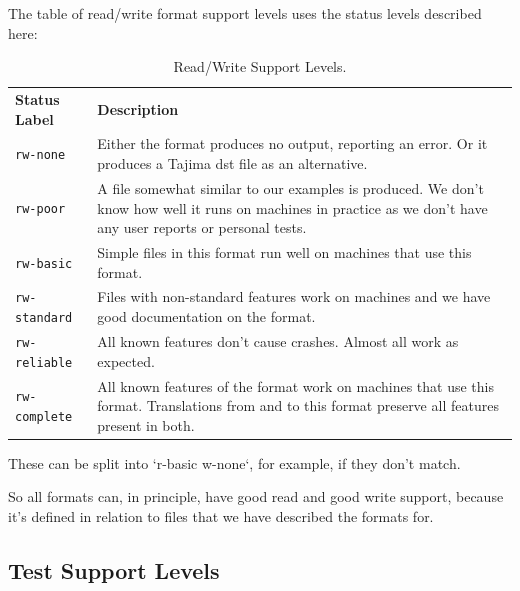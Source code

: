 \documentclass[10pt]{report}
\begin{document}
The table of read/write format support levels uses the status levels described here:

\begin{longtable}{p{4cm} p{8cm}}
\caption{Read/Write Support Levels.}
\label{tab:read-write-support} \\
\textbf{Status Label} &
\textbf{Description} \\

\texttt{rw-none} &
Either the format produces no output, reporting an error. Or it produces a
Tajima dst file as an alternative. \\

\texttt{rw-poor} &
A file somewhat similar to our examples is produced. We don't know how well
it runs on machines in practice as we don't have any user reports or personal
tests. \\

\texttt{rw-basic} &
Simple files in this format run well on machines that use this format. \\

\texttt{rw-standard} &
Files with non-standard features work on machines and we have good documentation
on the format. \\

\texttt{rw-reliable} &
All known features don't cause crashes. Almost all work as expected. \\

\texttt{rw-complete} &
All known features of the format work on machines that use this format.
Translations from and to this format preserve all features present in both.
\end{longtable}

These can be split into `r-basic w-none`, for example, if they don't match.

So all formats can, in principle, have good read and good write support, because it's defined in relation to files that we have described the formats for.

\subsection{Test Support Levels}
\end{document}
